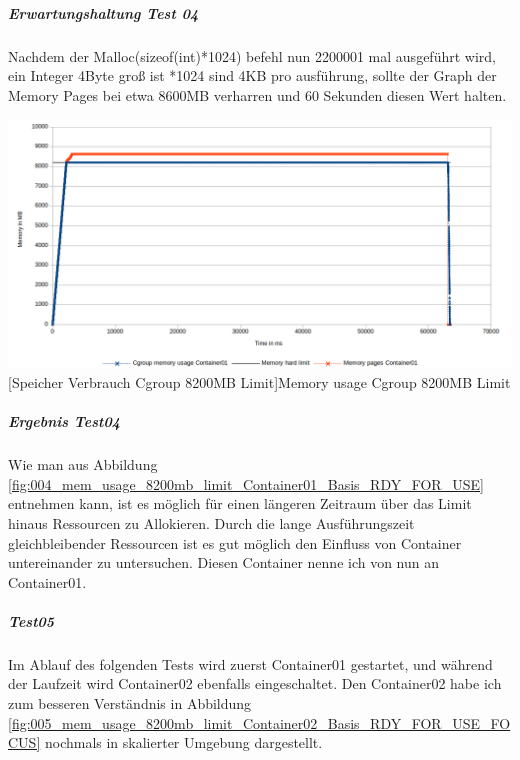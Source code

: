 \subparagraph{Erwartungshaltung Test 04}
Nachdem der Malloc(sizeof(int)*1024) befehl nun 2200001 mal ausgeführt wird, ein Integer 4Byte groß ist *1024 sind 4KB pro ausführung, sollte der Graph der Memory Pages bei etwa 8600MB verharren und 60 Sekunden diesen Wert halten.

\vspace{1em}
\begin{minipage}{\linewidth}
	\centering
	\includegraphics[width=1\linewidth]{pics/004_mem_usage_8200mb_limit_Container01_Basis_RDY_FOR_USE.png}
	[Speicher Verbrauch Cgroup 8200MB Limit]{Memory usage Cgroup 8200MB Limit}
	\label{fig:004_mem_usage_8200mb_limit_Container01_Basis_RDY_FOR_USE}
\end{minipage}

\subparagraph{Ergebnis Test04}
Wie man aus Abbildung \ref{fig:004_mem_usage_8200mb_limit_Container01_Basis_RDY_FOR_USE} entnehmen kann, ist es möglich für einen längeren Zeitraum über das Limit hinaus Ressourcen zu Allokieren. Durch die lange Ausführungszeit gleichbleibender Ressourcen ist es gut möglich den Einfluss von Container untereinander zu untersuchen. Diesen Container nenne ich von nun an Container01.

\subparagraph{Test05}
Im Ablauf des folgenden Tests wird zuerst Container01 gestartet, und während der Laufzeit wird Container02 ebenfalls eingeschaltet. Den Container02 habe ich zum besseren Verständnis in Abbildung \ref{fig:005_mem_usage_8200mb_limit_Container02_Basis_RDY_FOR_USE_FOCUS} nochmals in skalierter Umgebung dargestellt. 


